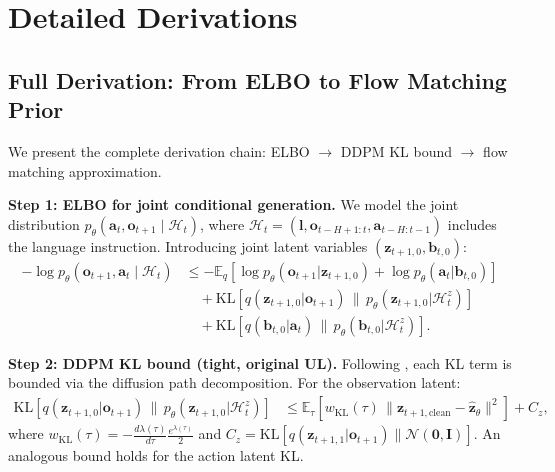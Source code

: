 \documentclass{article}
\newcommand{\vo}{\bm{o}}
\newcommand{\vz}{\bm{z}}
\newcommand{\va}{\bm{a}}
\newcommand{\vb}{\bm{b}}
\newcommand{\E}{\mathbb{E}}
\newcommand{\KL}{\mathrm{KL}}
\begin{document}
\appendix
\section{Detailed Derivations}
\label{app:derivations}

\subsection{Full Derivation: From ELBO to Flow Matching Prior}
\label{app:prior_derivation}

We present the complete derivation chain: ELBO $\to$ DDPM KL bound $\to$ flow matching approximation.

\textbf{Step 1: ELBO for joint conditional generation.}
We model the joint distribution $p_\theta(\va_t, \vo_{t+1} \mid \mathcal{H}_t)$, where $\mathcal{H}_t = (\bm{l}, \vo_{t-H+1:t}, \va_{t-H:t-1})$ includes the language instruction. Introducing joint latent variables $(\vz_{t+1,0}, \vb_{t,0})$:
\begin{align}
  -\log p_\theta(\vo_{t+1}, \va_t \mid \mathcal{H}_t)
  &\leq -\E_{q}\!\left[\log p_\theta(\vo_{t+1} | \vz_{t+1,0}) + \log p_\theta(\va_t | \vb_{t,0})\right] \nonumber \\
  &\quad + \KL\!\left[q(\vz_{t+1,0} | \vo_{t+1}) \,\|\, p_\theta(\vz_{t+1,0} | \mathcal{H}_t^z)\right] \nonumber \\
  &\quad + \KL\!\left[q(\vb_{t,0} | \va_t) \,\|\, p_\theta(\vb_{t,0} | \mathcal{H}_t^z)\right].
  \label{eq:app_joint_elbo}
\end{align}

\textbf{Step 2: DDPM KL bound (tight, original UL).}
Following \citet{kingma2021variational}, each KL term is bounded via the diffusion path decomposition. For the observation latent:
\begin{align}
  \KL\!\left[q(\vz_{t+1,0} | \vo_{t+1}) \,\|\, p_\theta(\vz_{t+1,0} | \mathcal{H}_t^z)\right]
  &\leq \E_\tau\!\left[w_{\KL}(\tau)\, \|\vz_{t+1,\text{clean}} - \hat{\vz}_\theta\|^2\right] + C_z,
  \label{eq:app_ddpm_bound}
\end{align}
where $w_{\KL}(\tau) = -\frac{d\lambda(\tau)}{d\tau}\frac{e^{\lambda(\tau)}}{2}$ and $C_z = \KL[q(\vz_{t+1,1} | \vo_{t+1}) \| \mathcal{N}(\bm{0}, \bm{I})]$. An analogous bound holds for the action latent KL.
\end{document}
